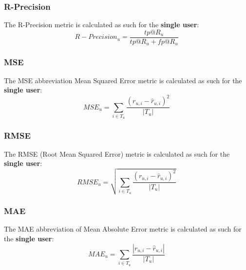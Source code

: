 
\subsubsection{R-Precision}\label{subsubsec:r-prec}
The R-Precision metric is calculated as such for the \textbf{single user}:
\hfill\break
\hfill\break
    \[
        R-Precision_u = \frac{tp@R_u}{tp@R_u + fp@R_u}
    \]


\subsubsection{MSE}\label{subsubsec:mse}
The MSE abbreviation Mean Squared Error metric is calculated as such for the \textbf{single user}:
\hfill\break
\hfill\break
    \[
        MSE_u = \sum_{i \in T_u} \frac{(r_{u,i} - \hat{r}_{u,i})^2}{|T_u|}
    \]


\subsubsection{RMSE}\label{subsubsec:rmse}
The RMSE (Root Mean Squared Error) metric is calculated as such for the \textbf{single user}:
\hfill\break
\hfill\break
    \[
        RMSE_u = \sqrt{\sum_{i \in T_u} \frac{(r_{u,i} - \hat{r}_{u,i})^2}{|T_u|}}
    \]
\hfill\break


\subsubsection{MAE}\label{subsubsec:mae}
The MAE abbreviation of Mean Absolute Error metric is calculated as such for the \textbf{single user}:
\hfill\break
\hfill\break
    \[
        MAE_u = \sum_{i \in T_u} \frac{|r_{u,i} - \hat{r}_{u,i}|}{|T_u|}
    \]
\hfill\break

